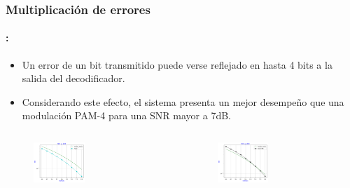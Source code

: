 \begin{frame}
  \frametitle{\textbf{Multiplicación de errores}}
\framesubtitle{\secname : \subsecname}
      \begin{block}{}

   \begin{itemize}\small
    \item Un error de un bit transmitido puede verse reflejado en hasta 4 bits a la salida
 del decodificador.
 \item Considerando este efecto, el sistema presenta un mejor desempeño que una modulación PAM-4 para una SNR mayor a 7dB.
 \end{itemize}
 \end{block}
     \vspace{-0.3cm}

\begin{columns}
    \begin{column}{0.65\paperwidth}
    \begin{figure}
        \centering
        \includegraphics[width=0.45\textwidth]{Graficos/BER_vs_SNR_4.png}%
        \label{fig:my_label}
    \end{figure}

    \end{column}
    \begin{column}{0.65\paperwidth}  
    
    \begin{figure}
        \centering
        \includegraphics[width=0.45\textwidth]{Graficos/BER_vs_SNR_5.png}
        \label{fig:my_label}
    \end{figure}
    
    \end{column}
\end{columns}
\end{frame}

